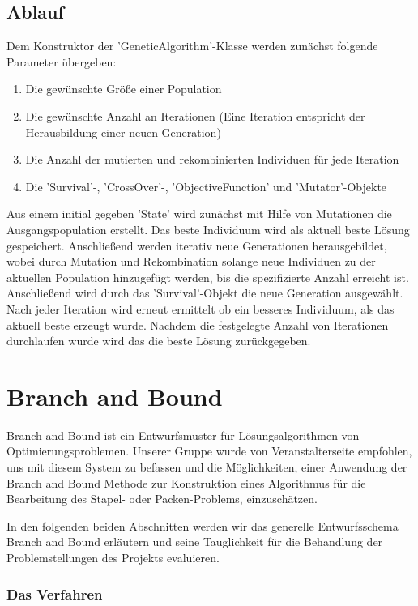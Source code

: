 \documentclass[runningheads,a4paper]{llncs}
\begin{document}
\subsection{Ablauf}

Dem Konstruktor der 'GeneticAlgorithm'-Klasse werden zunächst folgende Parameter übergeben:
\begin{enumerate}
\item Die gewünschte Größe einer Population 
\item Die gewünschte Anzahl an Iterationen (Eine Iteration entspricht der Herausbildung einer neuen Generation)
\item Die Anzahl der mutierten und rekombinierten Individuen für jede Iteration
\item Die 'Survival'-, 'CrossOver'-, 'ObjectiveFunction' und 'Mutator'-Objekte
\end{enumerate}
Aus einem initial gegeben 'State' wird zunächst mit Hilfe von Mutationen die Ausgangspopulation erstellt. Das beste Individuum wird als aktuell beste Lösung gespeichert. Anschließend werden iterativ neue Generationen herausgebildet, wobei durch Mutation und Rekombination solange neue Individuen zu der aktuellen Population hinzugefügt werden, bis die spezifizierte Anzahl erreicht ist. Anschließend wird durch das 'Survival'-Objekt die neue Generation ausgewählt. Nach jeder Iteration wird erneut ermittelt ob ein besseres Individuum, als das aktuell beste erzeugt wurde. Nachdem die festgelegte Anzahl von Iterationen durchlaufen wurde wird das die beste Lösung zurückgegeben. 

\section{Branch and Bound}

Branch and Bound ist ein Entwurfsmuster für Lösungsalgorithmen von Optimierungsproblemen. Unserer Gruppe wurde von Veranstalterseite empfohlen, uns mit diesem System zu befassen und die Möglichkeiten, einer Anwendung der Branch and Bound Methode zur Konstruktion eines Algorithmus für die Bearbeitung des Stapel- oder Packen-Problems, einzuschätzen.

In den folgenden beiden Abschnitten werden wir das generelle Entwurfsschema Branch and Bound erläutern und seine Tauglichkeit für die Behandlung der Problemstellungen des Projekts evaluieren.

\subsubsection{Das Verfahren}
\end{document}
